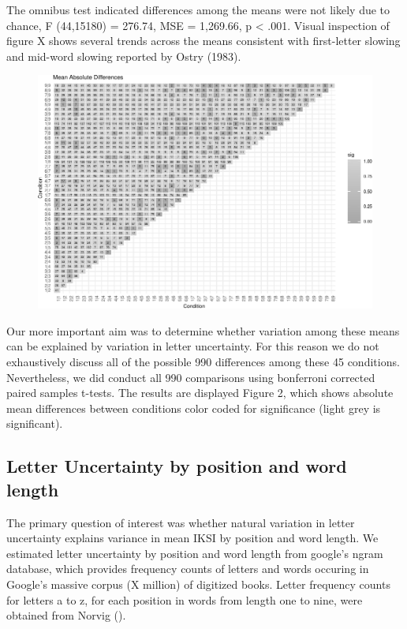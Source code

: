 \documentclass[floatsintext,man]{apa6}
\theoremstyle{definition}
\theoremstyle{definition}
\theoremstyle{definition}
\theoremstyle{remark}
\begin{document}
The omnibus test indicated differences among the means were not likely
due to chance, F (44,15180) = 276.74, MSE = 1,269.66, p \textless{}
.001. Visual inspection of figure X shows several trends across the
means consistent with first-letter slowing and mid-word slowing reported
by Ostry (1983).

\begin{figure}[htbp]
\centering
\includegraphics{Entropy_typing_draft_files/figure-latex/typing_mean_iksis_comparisons-1.pdf}
\caption{}
\end{figure}

Our more important aim was to determine whether variation among these
means can be explained by variation in letter uncertainty. For this
reason we do not exhaustively discuss all of the possible 990
differences among these 45 conditions. Nevertheless, we did conduct all
990 comparisons using bonferroni corrected paired samples t-tests. The
results are displayed Figure 2, which shows absolute mean differences
between conditions color coded for significance (light grey is
significant).

\subsection{Letter Uncertainty by position and word
length}\label{letter-uncertainty-by-position-and-word-length}

The primary question of interest was whether natural variation in letter
uncertainty explains variance in mean IKSI by position and word length.
We estimated letter uncertainty by position and word length from
google's ngram database, which provides frequency counts of letters and
words occuring in Google's massive corpus (X million) of digitized
books. Letter frequency counts for letters a to z, for each position in
words from length one to nine, were obtained from Norvig ().
\end{document}
